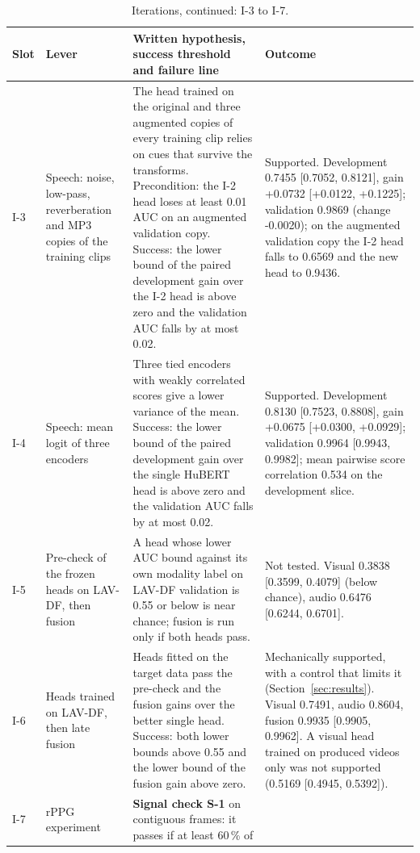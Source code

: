 \documentclass[conference,a4paper]{IEEEtran_nodash}
\begin{document}
\begin{table}[!t]
\centering
\caption[Iteration slots, continued]{Iterations, continued: I-3 to I-7.}
\label{tab:iters2}
\small
\begin{tabular}{@{}l L{2.4cm} L{7.1cm} L{3.8cm}@{}}
\toprule
Slot & Lever & Written hypothesis, success threshold and failure line & Outcome \\
\midrule
I-3 & Speech: noise, low-pass, reverberation and MP3 copies of the training clips &
The head trained on the original and three augmented copies of every training
clip relies on cues that survive the transforms. Precondition: the I-2 head
loses at least 0.01 AUC on an augmented validation copy. Success: the lower
bound of the paired development gain over the I-2 head is above zero and the
validation AUC falls by at most 0.02. &
Supported. Development 0.7455 [0.7052, 0.8121], gain +0.0732 [+0.0122,
+0.1225]; validation 0.9869 (change -0.0020); on the augmented validation copy
the I-2 head falls to 0.6569 and the new head to 0.9436. %
\\
\addlinespace[3pt]
I-4 & Speech: mean logit of three encoders &
Three tied encoders with weakly correlated scores give a lower variance of
the mean. Success: the lower bound of the paired development gain over the
single HuBERT head is above zero and the validation AUC falls by at most 0.02. &
Supported. Development 0.8130 [0.7523, 0.8808], gain +0.0675 [+0.0300,
+0.0929]; validation 0.9964 [0.9943, 0.9982]; mean pairwise score correlation
0.534 on the development slice. %
\\
\addlinespace[3pt]
I-5 & Pre-check of the frozen heads on LAV-DF, then fusion &
A head whose lower AUC bound against its own modality label on LAV-DF
validation is 0.55 or below is near chance; fusion is run only if both heads pass. &
Not tested. Visual 0.3838 [0.3599, 0.4079] (below chance), audio 0.6476
[0.6244, 0.6701]. %
\\
\addlinespace[3pt]
I-6 & Heads trained on LAV-DF, then late fusion &
Heads fitted on the target data pass the pre-check and the fusion gains over the
better single head. Success: both lower bounds above 0.55 and the lower bound of
the fusion gain above zero. &
Mechanically supported, with a control that limits it (Section~\ref{sec:results}).
Visual 0.7491, audio 0.8604, fusion 0.9935 [0.9905, 0.9962]. A visual head trained
on produced videos only was not supported (0.5169 [0.4945, 0.5392]). %
\\
\addlinespace[3pt]
I-7 & rPPG experiment &
\textbf{Signal check S-1} on contiguous frames: it passes if at least 60\,\% of

\end{tabular}
\end{table}
\end{document}
